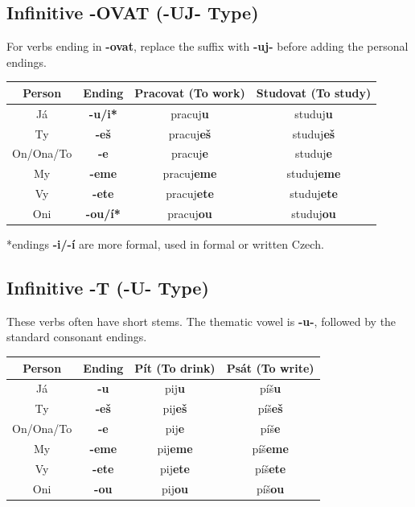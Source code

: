 \subsection{Infinitive -OVAT (-UJ- Type)}
For verbs ending in \textbf{-ovat}, replace the suffix with \textbf{-uj-} before adding the personal endings.
\begin{center}
\begin{tabular}{c|c|c|c}
\hline
    \textbf{Person} & \textbf{Ending} & \textbf{Pracovat (To work)} & \textbf{Studovat (To study)} \\ \hline
    Já & \textbf{-u/i*} & pracuj\textbf{u} & studuj\textbf{u} \\
    Ty & \textbf{-eš} & pracuj\textbf{eš} & studuj\textbf{eš} \\
    On/Ona/To & \textbf{-e} & pracuj\textbf{e} & studuj\textbf{e} \\ \hline
    My & \textbf{-eme} & pracuj\textbf{eme} & studuj\textbf{eme} \\
    Vy & \textbf{-ete} & pracuj\textbf{ete} & studuj\textbf{ete} \\
    Oni & \textbf{-ou/í*} & pracuj\textbf{ou} & studuj\textbf{ou} \\ \hline
\end{tabular}
\end{center}
*endings \textbf{-i/-í} are more formal, used in formal or written Czech.
\subsection{Infinitive -T (-U- Type)}
These verbs often have short stems. The thematic vowel is \textbf{-u-}, followed by the standard consonant endings.
\begin{center}
\begin{tabular}{c|c|c|c}
\hline
    \textbf{Person} & \textbf{Ending} & \textbf{Pít (To drink)} & \textbf{Psát (To write)} \\ \hline
    Já & \textbf{-u} & pij\textbf{u} & píš\textbf{u} \\
    Ty & \textbf{-eš} & pij\textbf{eš} & píš\textbf{eš} \\
    On/Ona/To & \textbf{-e} & pij\textbf{e} & píš\textbf{e} \\ \hline
    My & \textbf{-eme} & pij\textbf{eme} & píš\textbf{eme} \\
    Vy & \textbf{-ete} & pij\textbf{ete} & píš\textbf{ete} \\
    Oni & \textbf{-ou} & pij\textbf{ou} & píš\textbf{ou} \\ \hline
\end{tabular}
\end{center}


